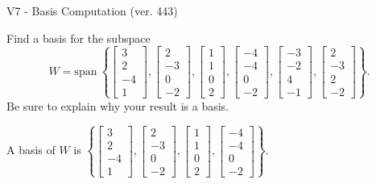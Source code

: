 \begin{exercise}
  \begin{exerciseTitle}V7 - Basis Computation (ver. 443)\end{exerciseTitle}
  \begin{exerciseStatement}
    Find a basis for the subspace 
\[W=\mathrm{span}\ \left\{\left[\begin{array}{r}
3 \\
2 \\
-4 \\
1
\end{array}\right] , \left[\begin{array}{r}
2 \\
-3 \\
0 \\
-2
\end{array}\right] , \left[\begin{array}{r}
1 \\
1 \\
0 \\
2
\end{array}\right] , \left[\begin{array}{r}
-4 \\
-4 \\
0 \\
-2
\end{array}\right] , \left[\begin{array}{r}
-3 \\
-2 \\
4 \\
-1
\end{array}\right] , \left[\begin{array}{r}
2 \\
-3 \\
2 \\
-2
\end{array}\right]\right\}.\]
 Be sure to explain why your result is a basis.


  \end{exerciseStatement}
  \begin{exerciseAnswer}
   A basis of \(W\) is  \(\left\{\left[\begin{array}{r}
3 \\
2 \\
-4 \\
1
\end{array}\right] , \left[\begin{array}{r}
2 \\
-3 \\
0 \\
-2
\end{array}\right] , \left[\begin{array}{r}
1 \\
1 \\
0 \\
2
\end{array}\right] , \left[\begin{array}{r}
-4 \\
-4 \\
0 \\
-2
\end{array}\right]\right\}\).
  


  \end{exerciseAnswer}
\end{exercise}